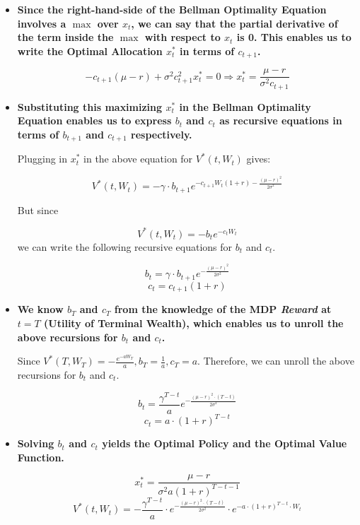 \documentclass[12pt]{amsart}
\begin{document}
\begin{itemize}
\item {\bf Since the right-hand-side of the Bellman Optimality Equation involves a $\max$ over $x_t$, we can say that the partial derivative of the term inside the $\max$ with respect to $x_t$ is 0. This enables us to write the Optimal Allocation $x_t^*$ in terms of $c_{t+1}$.}

$$ -c_{t+1} (\mu - r) + \sigma^2 c_{t+1}^2 x^*_t = 0 \Rightarrow x^*_t = \frac {\mu - r} {\sigma^2 c_{t+1}}$$

\item {\bf Substituting this maximizing $x_t^*$ in the Bellman Optimality Equation enables us to express $b_t$ and $c_t$ as recursive equations in terms of $b_{t+1}$ and $c_{t+1}$ respectively.}

Plugging in $x^*_t$ in the above equation for $V^*(t, W_t)$ gives:

$$V^*(t, W_t) = - \gamma \cdot b_{t+1} e^{-c_{t+1} W_t (1 + r) - \frac {(\mu - r)^2} {2 \sigma^2}} $$

But since

$$V^*(t, W_t) = -b_t e^{-c_t W_t}$$ we can write the following recursive equations for $b_t$ and $c_t$.

$$b_t = \gamma \cdot b_{t+1} e^{- \frac {(\mu -r)^2} {2 \sigma^2}}$$
$$c_t = c_{t+1} (1 + r)$$

\item {\bf We know $b_T$ and $c_T$ from the knowledge of the MDP {\em Reward} at $t=T$ (Utility of Terminal Wealth), which enables us to unroll the above recursions for $b_t$ and $c_t$.}

Since $V^*(T, W_T) = - \frac {e^{-a W_T}} a, b_T = \frac 1 a, c_T = a$. Therefore, we can unroll the above recursions for $b_t$ and $c_t$.

$$b_t = \frac {\gamma^{T-t}} a e^{- \frac {(\mu - r)^2 \cdot (T-t)} {2 \sigma^2}}$$
$$c_t = a \cdot (1+ r)^{T-t}$$

\item {\bf Solving $b_t$ and $c_t$ yields the Optimal Policy and the Optimal Value Function.}

$$x^*_t = \frac {\mu - r} {\sigma^2 a (1+ r)^{T-t-1}}$$
$$V^*(t, W_t) = - \frac {\gamma^{T-t}} a \cdot e^{- \frac {(\mu - r)^2 \cdot (T-t)} {2 \sigma^2}} \cdot e^{- a \cdot (1+ r)^{T-t} \cdot W_t}$$

\end{itemize}
\end{document}
